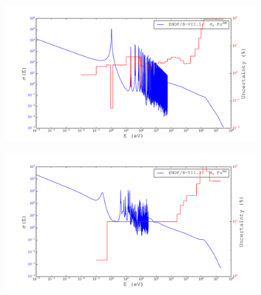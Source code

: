 \documentclass{beamer}
\begin{document}
\begin{frame}
    \begin{figure}[H]
    \begin{center}
      \hspace*{-0.7cm}\includegraphics[width=1.1\columnwidth]{../Weighting/X_Sections/XwVar_Pu_240_94_a.pdf}
      \vspace{-5mm}
      \label{fig:XPu240}
    \end{center}
  \end{figure}
\end{frame}

\begin{frame}
    \begin{figure}[H]
    \begin{center}
      \hspace*{-0.7cm}\includegraphics[width=1.1\columnwidth]{../Weighting/X_Sections/XwVar_Pu_241_94_a.pdf}
      \vspace{-5mm}
      \label{fig:XPu241}
    \end{center}
  \end{figure}
\end{frame}
\end{document}
